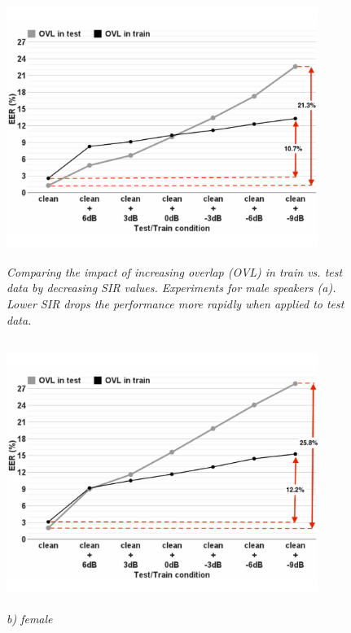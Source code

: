 \begin{figure}[h!]
	\includegraphics[height = 3.43in, width=0.9\textwidth]{figures/sidingrid_ovlintrainvstest_male_rev1}
	\caption{\it Comparing the impact of increasing overlap (OVL) in train vs. test data by decreasing SIR values. Experiments for male speakers (a). Lower SIR drops the performance more rapidly when applied to test data.}
	\label{fig:sidingrid_ovlintrainvstest_male}
\end{figure}

\begin{figure}[h!]
	\includegraphics[height = 3.43in, width=0.9\textwidth]{figures/sidingrid_ovlintrainvstest_female_rev1}
	\caption{\it b) female}
	\label{fig:sidingrid_ovlintrainvstest_female}
\end{figure}


